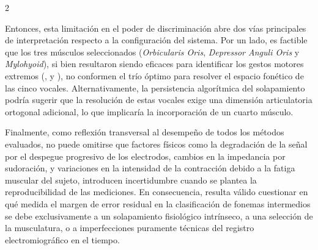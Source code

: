 \documentclass[11pt, letterpaper]{article}
\begin{document}
\begin{multicols*}{2}
    
    

Entonces, esta limitación en el poder de discriminación abre dos vías principales de interpretación respecto a la configuración del sistema. Por un lado, es factible que los tres músculos seleccionados (\textit{Orbicularis Oris}, \textit{Depressor Anguli Oris} y \textit{Mylohyoid}), si bien resultaron siendo eficaces para identificar los gestos motores extremos (,  y ), no conformen el trío óptimo para resolver el espacio fonético de las cinco vocales. Alternativamente, la persistencia algorítmica del solapamiento podría sugerir que la resolución de estas vocales exige una dimensión articulatoria ortogonal adicional, lo que implicaría la incorporación de un cuarto músculo.

Finalmente, como reflexión transversal al desempeño de todos los métodos evaluados, no puede omitirse que factores físicos como la degradación de la señal por el despegue progresivo de los electrodos, cambios en la impedancia por sudoración, y variaciones en la intensidad de la contracción debido a la fatiga muscular del sujeto, introducen incertidumbre cuando se plantea la reproducibilidad de las mediciones. En consecuencia, resulta válido cuestionar en qué medida el margen de error residual en la clasificación de fonemas intermedios se debe exclusivamente a un solapamiento fisiológico intrínseco, a una selección  de la musculatura, o a imperfecciones puramente técnicas del registro electromiográfico en el tiempo.



\end{multicols*}
\end{document}
